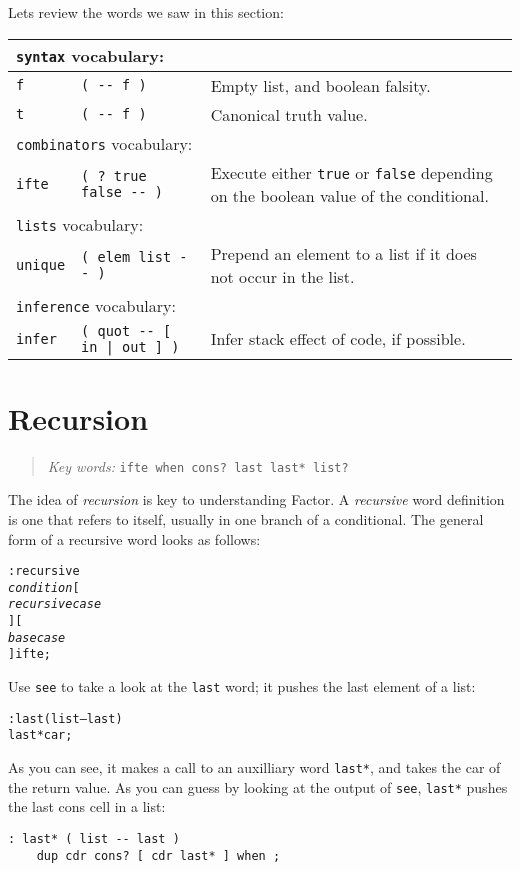 \documentclass[english]{book}
\newcommand{\chapkeywords}[1]{%
\begin{quote}
\emph{Key words:} \texttt{#1}
\end{quote}
}
\newcommand{\wordtable}[1]{{
\begin{tabularx}{12cm}{|l l X|}
#1
\hline
\end{tabularx}}}
\newcommand{\tabvocab}[1]{
\hline
\multicolumn{3}{|l|}{
\rule[-2mm]{0mm}{6mm}
\texttt{#1} vocabulary:}
\\
\hline
}
\begin{document}
Lets review the words we saw in this section:

\wordtable{
\tabvocab{syntax}
\texttt{f}&
\texttt{( -{}- f )}&
Empty list, and boolean falsity.\\
\texttt{t}&
\texttt{( -{}- f )}&
Canonical truth value.\\
\tabvocab{combinators}
\texttt{ifte}&
\texttt{( ?~true false -{}- )}&
Execute either \texttt{true} or \texttt{false} depending on the boolean value of the conditional.\\
\tabvocab{lists}
\texttt{unique}&
\texttt{( elem list -{}- )}&
Prepend an element to a list if it does not occur in the
list.\\
\tabvocab{inference}
\texttt{infer}&
\texttt{( quot -{}- {[} in | out {]} )}&
Infer stack effect of code, if possible.\\}

\section{Recursion}

\chapkeywords{ifte when cons?~last last* list?}

The idea of \emph{recursion} is key to understanding Factor. A \emph{recursive} word definition is one that refers to itself, usually in one branch of a conditional. The general form of a recursive word looks as follows:

\begin{alltt}
: recursive
    \emph{condition} {[}
        \emph{recursive case}
    {] [}
        \emph{base case}
    {]} ifte ;
\end{alltt}

Use \texttt{see} to take a look at the \texttt{last} word; it pushes the last element of a list:

\begin{alltt}
: last ( list -- last )
    last* car ;
\end{alltt}

As you can see, it makes a call to an auxilliary word \texttt{last*}, and takes the car of the return value. As you can guess by looking at the output of \texttt{see}, \texttt{last*} pushes the last cons cell in a list:

\begin{verbatim}
: last* ( list -- last )
    dup cdr cons? [ cdr last* ] when ;
\end{verbatim}
\end{document}
